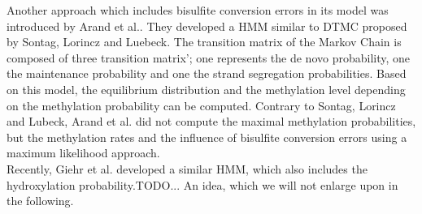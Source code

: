 Another approach which includes bisulfite conversion errors in its model was introduced by Arand et al..\cite{Wolf} They developed a \ac{HMM} similar to \ac{DTMC} proposed by Sontag, Lorincz and Luebeck.\cite{Sontag} The transition matrix of the Markov Chain is composed of three transition matrix'; one represents the de novo probability, one the maintenance probability and one the strand segregation probabilities. Based on this model, the equilibrium distribution and the methylation level depending on the methylation probability can be computed. Contrary to Sontag, Lorincz and Lubeck, Arand et al. did not compute the maximal methylation probabilities, but the methylation rates and the influence of bisulfite conversion errors using a maximum likelihood approach.\cite{Wolf}\\

Recently, Giehr et al. developed a similar \ac{HMM}, which also includes the hydroxylation probability.TODO... An idea, which we will not enlarge upon in the following.\cite{Giehr}\\

